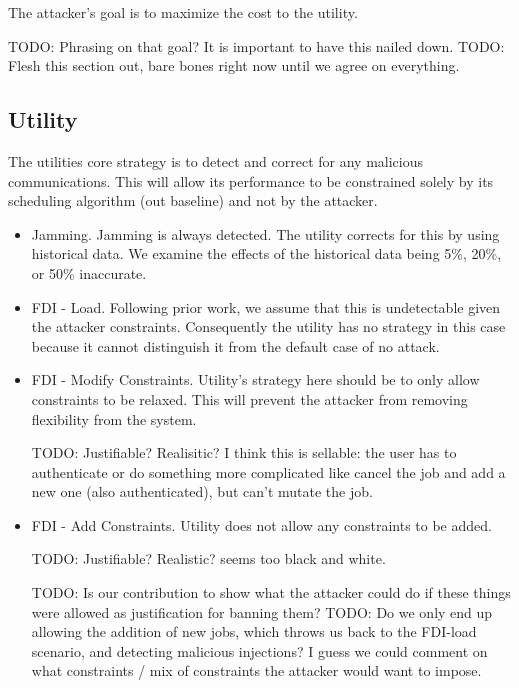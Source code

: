 \documentclass[conference]{IEEEtran}
\begin{document}
The attacker's goal is to maximize the cost to the utility.

TODO: Phrasing on that goal?  It is important to have this nailed down.
TODO: Flesh this section out, bare bones right now until we agree on everything.

\subsection{Utility}
\label{Utility2}

The utilities core strategy is to detect and correct for any malicious communications.  This will allow its performance to be
constrained solely by its scheduling algorithm (out baseline) and not by the attacker.

\begin{itemize}
\item Jamming.  Jamming is always detected.  The utility corrects for this by using historical data.  We examine the effects 
of the historical data being 5\%, 20\%, or 50\% inaccurate.

\item FDI - Load.  Following prior work, we assume that this is undetectable given the attacker constraints.  Consequently
the utility has no strategy in this case because it cannot distinguish it from the default case of no attack.

\item FDI - Modify Constraints.  Utility's strategy here should be to only allow constraints to be relaxed.  This will prevent
the attacker from removing flexibility from the system.

TODO: Justifiable?  Realisitic?  I think this is sellable: the user has to authenticate or do something more complicated like
cancel the job and add a new one (also authenticated), but can't mutate the job.

\item FDI - Add Constraints.  Utility does not allow any constraints to be added.

TODO: Justifiable?  Realistic?  seems too black and white.

TODO: Is our contribution to show what the attacker could do if these things were allowed as justification for banning them?
TODO: Do we only end up allowing the addition of new jobs, which throws us back to the FDI-load scenario, and detecting 
malicious injections?  I guess we could comment on what constraints / mix of constraints the attacker would want to impose.

\end{itemize}
\end{document}
